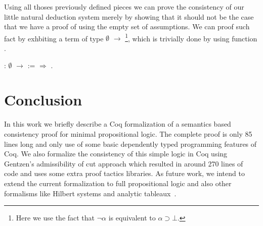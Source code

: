 Using all thoses previously defined pieces we can prove the consistency of our little natural
deduction system merely by showing that it should not be the case that we have a proof of 
using the empty set of assumptions. We can proof such fact by exhbiting a term of type
 $\emptyset$  \ensuremath{\rightarrow} \footnote{Here we use the fact that $\neg \alpha$ is
equivalent to $\alpha \supset \bot$.}, which is trivially done by using function .
 \begin{coqdoccode}
\coqdocemptyline
\coqdocnoindent
{}  :  $\emptyset$  \ensuremath{\rightarrow}  :=   \ensuremath{\Rightarrow}   .\coqdoceol
\coqdocemptyline
\end{coqdoccode}
\section{Conclusion}\label{sec:conclusion}


In this work we briefly describe a Coq formalization of a semantics based consistency proof for
minimal propositional logic. The complete proof is only 85 lines long and only use of some basic
dependently typed programming features of Coq. We also
formalize the consistency of this simple logic in Coq using Gentzen's admissibility of cut approach
which resulted in around 270 lines of code and uses some extra proof tactics libraries.
As future work, we intend to extend the current formalization to full propositional logic and also
other formalisms like Hilbert systems and analytic tableaux~\cite{smullyan1995first}.


 \begin{coqdoccode}
\end{coqdoccode}
